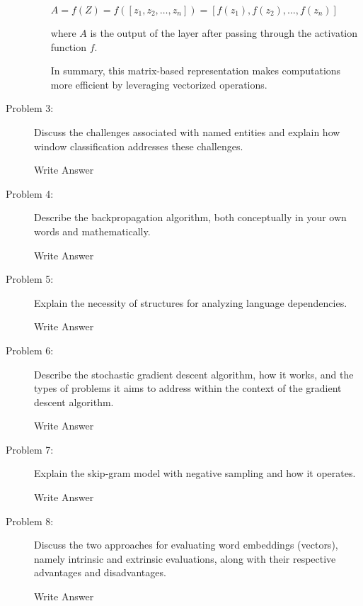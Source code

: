 \documentclass[12pt]{article}
\begin{document}
\begin{description}
\begin{enumerate}
    \begin{center}
      $\displaystyle{A = f(Z) = f([z_1, z_2, \hdots , z_n]) = [f(z_1), f(z_2), \hdots , f(z_n)]}$
    \end{center}

    where $A$ is the output of the layer after passing through the activation function $f$. 

    In summary, this matrix-based representation makes computations more efficient by leveraging vectorized operations.

  \end{enumerate}

  \pagebreak

  \item[Problem 3:] Discuss the challenges associated with named entities and explain how window classification addresses these challenges.
  
  Write Answer

  \pagebreak

  \item[Problem 4:] Describe the backpropagation algorithm, both conceptually in your own words and mathematically.
  
  Write Answer

  \pagebreak

  \item[Problem 5:] Explain the necessity of structures for analyzing language dependencies.
  
  Write Answer

  \pagebreak

  \item[Problem 6:] Describe the stochastic gradient descent algorithm, how it works, and the types of problems it aims to address within the context of the gradient descent algorithm.
  
  Write Answer

  \pagebreak

  \item[Problem 7:] Explain the skip-gram model with negative sampling and how it operates.
  
  Write Answer

  \pagebreak

  \item[Problem 8:] Discuss the two approaches for evaluating word embeddings (vectors), namely intrinsic and extrinsic evaluations, along with their respective advantages and disadvantages.
  
  Write Answer


\end{description}
\end{document}
